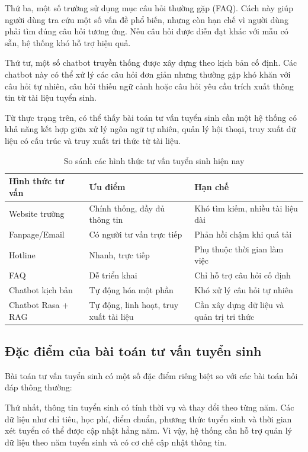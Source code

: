 \documentclass[12pt,a4paper]{report}
\begin{document}
Thứ ba, một số trường sử dụng mục câu hỏi thường gặp (FAQ). Cách này giúp người dùng tra cứu một số vấn đề phổ biến, nhưng còn hạn chế vì người dùng phải tìm đúng câu hỏi tương ứng. Nếu câu hỏi được diễn đạt khác với mẫu có sẵn, hệ thống khó hỗ trợ hiệu quả.

Thứ tư, một số chatbot truyền thống được xây dựng theo kịch bản cố định. Các chatbot này có thể xử lý các câu hỏi đơn giản nhưng thường gặp khó khăn với câu hỏi tự nhiên, câu hỏi thiếu ngữ cảnh hoặc câu hỏi yêu cầu trích xuất thông tin từ tài liệu tuyển sinh.

Từ thực trạng trên, có thể thấy bài toán tư vấn tuyển sinh cần một hệ thống có khả năng kết hợp giữa xử lý ngôn ngữ tự nhiên, quản lý hội thoại, truy xuất dữ liệu có cấu trúc và truy xuất tri thức từ tài liệu.

\begin{table}[H]
    \centering
    \caption{So sánh các hình thức tư vấn tuyển sinh hiện nay}
    \label{tab:comparison_admission_consulting_methods}
    \begin{tabular}{|p{3.4cm}|p{5.2cm}|p{5.2cm}|}
        \hline
        \textbf{Hình thức tư vấn} & \textbf{Ưu điểm} & \textbf{Hạn chế} \\ \hline
        Website trường & Chính thống, đầy đủ thông tin & Khó tìm kiếm, nhiều tài liệu dài \\ \hline
        Fanpage/Email & Có người tư vấn trực tiếp & Phản hồi chậm khi quá tải \\ \hline
        Hotline & Nhanh, trực tiếp & Phụ thuộc thời gian làm việc \\ \hline
        FAQ & Dễ triển khai & Chỉ hỗ trợ câu hỏi cố định \\ \hline
        Chatbot kịch bản & Tự động hóa một phần & Khó xử lý câu hỏi tự nhiên \\ \hline
        Chatbot Rasa + RAG & Tự động, linh hoạt, truy xuất tài liệu & Cần xây dựng dữ liệu và quản trị tri thức \\ \hline
    \end{tabular}
\end{table}

\subsection{Đặc điểm của bài toán tư vấn tuyển sinh}

Bài toán tư vấn tuyển sinh có một số đặc điểm riêng biệt so với các bài toán hỏi đáp thông thường:

Thứ nhất, thông tin tuyển sinh có tính thời vụ và thay đổi theo từng năm. Các dữ liệu như chỉ tiêu, học phí, điểm chuẩn, phương thức tuyển sinh và thời gian xét tuyển có thể được cập nhật hằng năm. Vì vậy, hệ thống cần hỗ trợ quản lý dữ liệu theo năm tuyển sinh và có cơ chế cập nhật thông tin.
\end{document}
